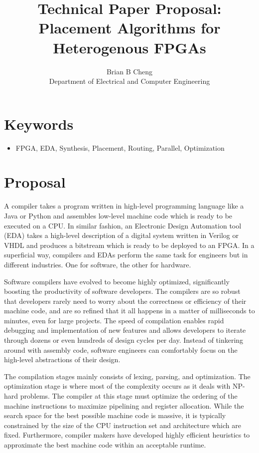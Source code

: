 \documentclass{article}
\begin{document}
\title{Technical Paper Proposal: \\ Placement Algorithms for Heterogenous FPGAs}
\author{Brian B Cheng \\ Department of Electrical and Computer Engineering}


\date{}
\maketitle

\section{Keywords}
\begin{itemize}
    \item FPGA, EDA, Synthesis, Placement, Routing, Parallel, Optimization
\end{itemize}


\section{Proposal}
    A compiler takes a program written in high-level programming language like a Java or Python and assembles low-level machine code which is ready to be executed on a CPU.
    In similar fashion, an Electronic Design Automation tool (EDA) takes a high-level description of a digital system written in Verilog or VHDL and produces a bitstream which is ready to be deployed to an FPGA.
    In a superficial way, compilers and EDAs perform the same task for engineers but in different industries. 
    One for software, the other for hardware.

    Software compilers have evolved to become highly optimized, significantly boosting the productivity of software developers. 
    The compilers are so robust that developers rarely need to worry about the correctness or efficiency of their machine code, and are so refined that it all happens in a matter of milliseconds to minutes, even for large projects. %
    The speed of compilation enables rapid debugging and implementation of new features and allows developers to iterate through dozens or even hundreds of design cycles per day.
    Instead of tinkering around with assembly code, software engineers can comfortably focus on the high-level abstractions of their design. 

    The compilation stages mainly consists of lexing, parsing, and optimization.
    The optimization stage is where most of the complexity occurs as it deals with NP-hard problems.
    The compiler at this stage must optimize the ordering of the machine instructions to maximize pipelining and register allocation.
    While the search space for the best possible machine code is massive, it is typically constrained by the size of the CPU instruction set and architecture which are fixed.
    Furthermore, compiler makers have developed highly efficient heuristics to approximate the best machine code within an acceptable runtime.
\end{document}
